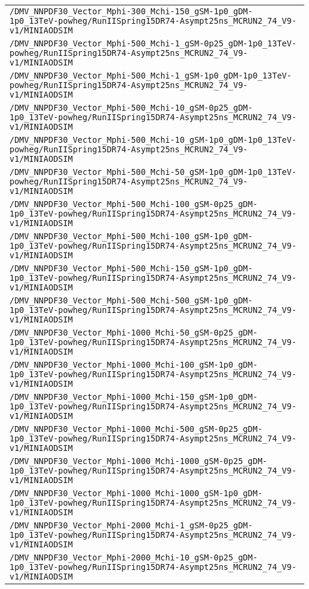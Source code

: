\begin{center}
\begin{tabular}{l}
\verb!/DMV_NNPDF30_Vector_Mphi-300_Mchi-150_gSM-1p0_gDM-1p0_13TeV-powheg/RunIISpring15DR74-Asympt25ns_MCRUN2_74_V9-v1/MINIAODSIM! \tabularnewline
\verb!/DMV_NNPDF30_Vector_Mphi-500_Mchi-1_gSM-0p25_gDM-1p0_13TeV-powheg/RunIISpring15DR74-Asympt25ns_MCRUN2_74_V9-v1/MINIAODSIM! \tabularnewline
\verb!/DMV_NNPDF30_Vector_Mphi-500_Mchi-1_gSM-1p0_gDM-1p0_13TeV-powheg/RunIISpring15DR74-Asympt25ns_MCRUN2_74_V9-v1/MINIAODSIM! \tabularnewline
\verb!/DMV_NNPDF30_Vector_Mphi-500_Mchi-10_gSM-0p25_gDM-1p0_13TeV-powheg/RunIISpring15DR74-Asympt25ns_MCRUN2_74_V9-v1/MINIAODSIM! \tabularnewline
\verb!/DMV_NNPDF30_Vector_Mphi-500_Mchi-10_gSM-1p0_gDM-1p0_13TeV-powheg/RunIISpring15DR74-Asympt25ns_MCRUN2_74_V9-v1/MINIAODSIM! \tabularnewline
\verb!/DMV_NNPDF30_Vector_Mphi-500_Mchi-50_gSM-1p0_gDM-1p0_13TeV-powheg/RunIISpring15DR74-Asympt25ns_MCRUN2_74_V9-v1/MINIAODSIM! \tabularnewline
\verb!/DMV_NNPDF30_Vector_Mphi-500_Mchi-100_gSM-0p25_gDM-1p0_13TeV-powheg/RunIISpring15DR74-Asympt25ns_MCRUN2_74_V9-v1/MINIAODSIM! \tabularnewline
\verb!/DMV_NNPDF30_Vector_Mphi-500_Mchi-100_gSM-1p0_gDM-1p0_13TeV-powheg/RunIISpring15DR74-Asympt25ns_MCRUN2_74_V9-v1/MINIAODSIM! \tabularnewline
\verb!/DMV_NNPDF30_Vector_Mphi-500_Mchi-150_gSM-1p0_gDM-1p0_13TeV-powheg/RunIISpring15DR74-Asympt25ns_MCRUN2_74_V9-v1/MINIAODSIM! \tabularnewline
\verb!/DMV_NNPDF30_Vector_Mphi-500_Mchi-500_gSM-1p0_gDM-1p0_13TeV-powheg/RunIISpring15DR74-Asympt25ns_MCRUN2_74_V9-v1/MINIAODSIM! \tabularnewline
\verb!/DMV_NNPDF30_Vector_Mphi-1000_Mchi-50_gSM-0p25_gDM-1p0_13TeV-powheg/RunIISpring15DR74-Asympt25ns_MCRUN2_74_V9-v1/MINIAODSIM! \tabularnewline
\verb!/DMV_NNPDF30_Vector_Mphi-1000_Mchi-100_gSM-1p0_gDM-1p0_13TeV-powheg/RunIISpring15DR74-Asympt25ns_MCRUN2_74_V9-v1/MINIAODSIM! \tabularnewline
\verb!/DMV_NNPDF30_Vector_Mphi-1000_Mchi-150_gSM-1p0_gDM-1p0_13TeV-powheg/RunIISpring15DR74-Asympt25ns_MCRUN2_74_V9-v1/MINIAODSIM! \tabularnewline
\verb!/DMV_NNPDF30_Vector_Mphi-1000_Mchi-500_gSM-0p25_gDM-1p0_13TeV-powheg/RunIISpring15DR74-Asympt25ns_MCRUN2_74_V9-v1/MINIAODSIM! \tabularnewline
\verb!/DMV_NNPDF30_Vector_Mphi-1000_Mchi-1000_gSM-0p25_gDM-1p0_13TeV-powheg/RunIISpring15DR74-Asympt25ns_MCRUN2_74_V9-v1/MINIAODSIM! \tabularnewline
\verb!/DMV_NNPDF30_Vector_Mphi-1000_Mchi-1000_gSM-1p0_gDM-1p0_13TeV-powheg/RunIISpring15DR74-Asympt25ns_MCRUN2_74_V9-v1/MINIAODSIM! \tabularnewline
\verb!/DMV_NNPDF30_Vector_Mphi-2000_Mchi-1_gSM-0p25_gDM-1p0_13TeV-powheg/RunIISpring15DR74-Asympt25ns_MCRUN2_74_V9-v1/MINIAODSIM! \tabularnewline
\verb!/DMV_NNPDF30_Vector_Mphi-2000_Mchi-10_gSM-0p25_gDM-1p0_13TeV-powheg/RunIISpring15DR74-Asympt25ns_MCRUN2_74_V9-v1/MINIAODSIM! \tabularnewline

\end{tabular}
\end{center}
